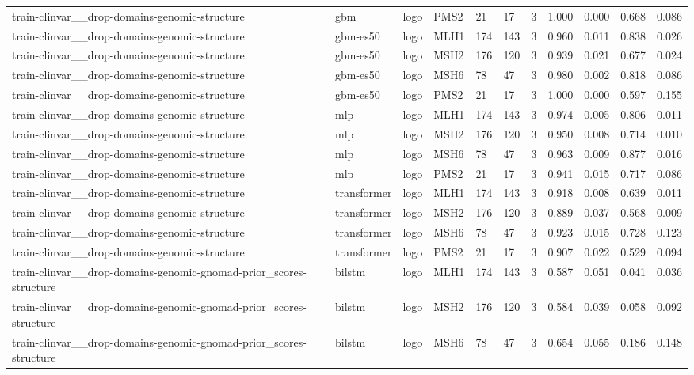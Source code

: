 \begin{table}[t]
\begin{tabular}{lllllllllll}
train-clinvar\_\_drop-domains-genomic-structure & gbm & logo & PMS2 & 21 & 17 & 3 & 1.000 & 0.000 & 0.668 & 0.086 \\
train-clinvar\_\_drop-domains-genomic-structure & gbm-es50 & logo & MLH1 & 174 & 143 & 3 & 0.960 & 0.011 & 0.838 & 0.026 \\
train-clinvar\_\_drop-domains-genomic-structure & gbm-es50 & logo & MSH2 & 176 & 120 & 3 & 0.939 & 0.021 & 0.677 & 0.024 \\
train-clinvar\_\_drop-domains-genomic-structure & gbm-es50 & logo & MSH6 & 78 & 47 & 3 & 0.980 & 0.002 & 0.818 & 0.086 \\
train-clinvar\_\_drop-domains-genomic-structure & gbm-es50 & logo & PMS2 & 21 & 17 & 3 & 1.000 & 0.000 & 0.597 & 0.155 \\
train-clinvar\_\_drop-domains-genomic-structure & mlp & logo & MLH1 & 174 & 143 & 3 & 0.974 & 0.005 & 0.806 & 0.011 \\
train-clinvar\_\_drop-domains-genomic-structure & mlp & logo & MSH2 & 176 & 120 & 3 & 0.950 & 0.008 & 0.714 & 0.010 \\
train-clinvar\_\_drop-domains-genomic-structure & mlp & logo & MSH6 & 78 & 47 & 3 & 0.963 & 0.009 & 0.877 & 0.016 \\
train-clinvar\_\_drop-domains-genomic-structure & mlp & logo & PMS2 & 21 & 17 & 3 & 0.941 & 0.015 & 0.717 & 0.086 \\
train-clinvar\_\_drop-domains-genomic-structure & transformer & logo & MLH1 & 174 & 143 & 3 & 0.918 & 0.008 & 0.639 & 0.011 \\
train-clinvar\_\_drop-domains-genomic-structure & transformer & logo & MSH2 & 176 & 120 & 3 & 0.889 & 0.037 & 0.568 & 0.009 \\
train-clinvar\_\_drop-domains-genomic-structure & transformer & logo & MSH6 & 78 & 47 & 3 & 0.923 & 0.015 & 0.728 & 0.123 \\
train-clinvar\_\_drop-domains-genomic-structure & transformer & logo & PMS2 & 21 & 17 & 3 & 0.907 & 0.022 & 0.529 & 0.094 \\
train-clinvar\_\_drop-domains-genomic-gnomad-prior\_scores-structure & bilstm & logo & MLH1 & 174 & 143 & 3 & 0.587 & 0.051 & 0.041 & 0.036 \\
train-clinvar\_\_drop-domains-genomic-gnomad-prior\_scores-structure & bilstm & logo & MSH2 & 176 & 120 & 3 & 0.584 & 0.039 & 0.058 & 0.092 \\
train-clinvar\_\_drop-domains-genomic-gnomad-prior\_scores-structure & bilstm & logo & MSH6 & 78 & 47 & 3 & 0.654 & 0.055 & 0.186 & 0.148 \\

\end{tabular}
\end{table}
